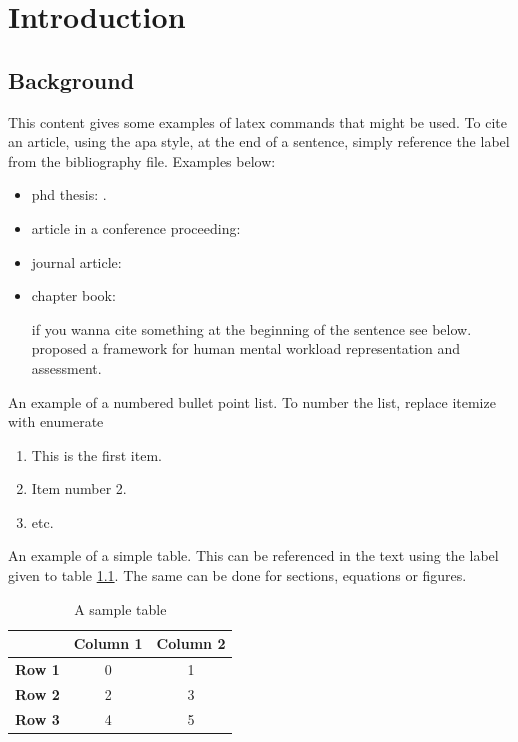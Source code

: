 \documentclass[oneside,12pt]{book}
\begin{document}
\newpage

\fancyhead[RE,LO]{\leftmark}
\renewcommand{\headrulewidth}{2pt}



\chapter{Introduction}
\section{Background}
\par This content gives some examples of latex commands that might be used. To cite an article, using the apa style, at the end of a sentence, simply reference the label from the bibliography file. Examples below:
\begin{itemize} 
\item phd thesis: \cite{Longo2014}.
\item article in a conference proceeding: \cite{Longo2016}
\item journal article: \cite{Longo2015a}
\item chapter book: \cite{Longo2011c}

if you wanna cite something at the beginning of the sentence see below.\\

 proposed a framework for human mental workload representation and assessment.


\end{itemize}
\par An example of a numbered bullet point list. To number the list, replace itemize with enumerate
\begin{enumerate}
\item This is the first item.
\item Item number 2.
\item etc.
\end{enumerate}

\par An example of a simple table. This can be referenced in the text using the label given to table \ref{tab:sample_table}. The same can be done for sections, equations or figures.
\begin{table}[H]
  \centering
    \begin{tabular}{| c | c | c |}
    \hline
     & \textbf{Column 1} & \textbf{Column 2} \\ \hline
    \textbf{Row 1} & 0 & 1 \\ \hline
    \textbf{Row 2} & 2 & 3 \\ \hline
    \textbf{Row 3} & 4 & 5 \\ \hline
    \end{tabular}
  \caption{A sample table}
  \label{tab:sample_table}
\end{table}
\end{document}
